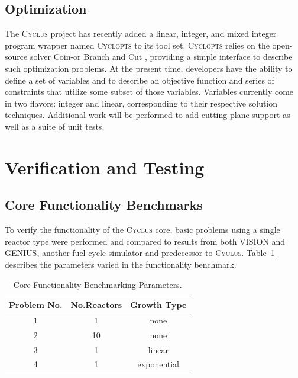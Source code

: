\documentclass{anstrans}
\begin{document}
\subsection{Optimization}
The \textsc{Cyclus} project has recently added a linear, integer, and
mixed integer program wrapper named \textsc{Cyclopts} \cite{cyclopts2012} to
its tool set. \textsc{Cyclopts} relies on the open-source solver Coin-or Branch
and Cut \cite{coinCBC}, providing a simple interface to describe such
optimization problems. At the present time, developers have the
ability to define a set of variables and to describe an objective
function and series of constraints that utilize some subset of those
variables. Variables currently come in two flavors: integer and
linear, corresponding to their respective solution
techniques. Additional work will be performed to add cutting plane
support as well as a suite of unit tests.

\section{Verification and Testing}

\subsection{Core Functionality Benchmarks}
To verify the functionality of the \textsc{Cyclus} core, basic problems using a 
single reactor type were performed and compared to results from both VISION and 
GENIUS\cite{juchau2008}, another fuel cycle simulator and predecessor to 
\textsc{Cyclus}. Table~\ref{tab:scenarioparams} describes the parameters varied 
in the functionality benchmark.
\begin{table} [h]
\centering
\begin{tabular} {|c|c|c|} 
\hline
Problem No. & No.Reactors & Growth Type \\
\hline
1           & 1          & none        \\
2           & 10         & none        \\
3           & 1          & linear      \\
4           & 1          & exponential \\
\hline
\end{tabular}
  \caption{Core Functionality Benchmarking Parameters.}
  \label{tab:scenarioparams}
\end{table}
\end{document}

